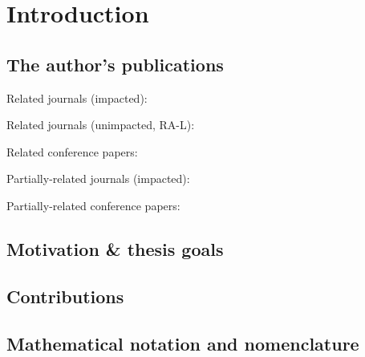 \documentclass[a4paper,11pt,titlepage,twoside]{book}
\newcommand{\chapternoclear}[1]{
  \begingroup
  \let\cleardoublepage\clearpage
  \chapter{#1}
  \endgroup
}
\begin{document}


\pagestyle{fancy}

\tableofcontents


\cleardoublepage


\chapternoclear{Introduction}


\section{The author's publications}


Related journals (impacted):
\cite{baca2018rospix}
\cite{baca2019autonomous}
\cite{spurny2019cooperative}
\cite{saska2017system}
\cite{giernacky2019realtime}
\cite{chudoba2016exploration}
\cite{saska2020formation}

Related journals (unimpacted, RA-L):
\cite{loianno2018localization}
\cite{petrlik2020robust}
\cite{stibinger2020localization}

Related conference papers:
\cite{baca2019timepix}
\cite{baca2018model}
\cite{baca2016embedded}
\cite{baca2017autonomous}
\cite{saska2017documentation}
\cite{spurny2016complex}
\cite{faigl2017onsolution}
\cite{saska2016formations}
\cite{roucek2019darpa}

Partially-related journals (impacted):
\cite{baca2016miniaturized}
\cite{baca2018timepix}
\cite{daniel2019inorbit}
\cite{urban2017vzlusat}

Partially-related conference papers:
\cite{daniel2016terrestrial}
\cite{daniel2017xray}


\section{Motivation \& thesis goals}

\section{Contributions}

\section{Mathematical notation and nomenclature}
\end{document}
